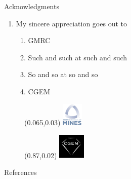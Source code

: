 \documentclass[aspectratio=169]{beamer}
\begin{document}
  \begin{frame}{Acknowledgments}
    \vspace{-2cm}
    \begin{enumerate}
      \item My sincere appreciation goes out to
      \begin{enumerate}
        \item GMRC
        \item Such and such at such and such
        \item So and so at so and so
        \item CGEM 
      \end{enumerate}
    \end{enumerate}
  \end{frame}

  \begin{frame}[plain]
    \begin{figure}
      \begin{textblock*}{1cm}(0.065\paperwidth,0.03\paperheight)
        \includegraphics[width=1cm]{mines-2018}
      \end{textblock*}
    \end{figure}
    \begin{figure}
      \begin{textblock*}{1cm}(0.87\paperwidth,0.02\paperheight)
        \includegraphics[width=1.3cm]{cgem-logo}
      \end{textblock*}
    \end{figure}
    \makequestion{-8mm}{-2mm}{1.75cm}{1.82cm}{1mm}
  \end{frame}

  \begin{frame}{References}
    \printbibliography
  \end{frame}
\end{document}
